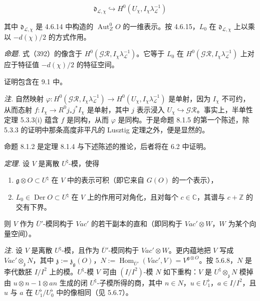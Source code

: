 \begin{equation}\tag{392}
\mathfrak{d}_{\mathcal{L},\chi}\hookrightarrow H^{0}(U_{\chi},I_{\chi}\lambda_{\mathcal{L}}^{-1})
\end{equation}

其中 $\mathfrak{d}_{\mathcal{L},\chi}$ 是 4.6.14 中构造的 $\operatorname{Aut}^{0}_{Z}O$ 的一维表示。按 4.6.15，$L_{0}$ 在 $\mathfrak{d}_{\mathcal{L},\chi}$ 上以乘以 $-d(\chi)/2$ 的方式作用。

 \emph{命题.} 式（392）的像含于 $H^{0}(\mathcal{GR},I_{\chi}\lambda_{\mathcal{L}}^{-1})$。它等于 $L_{0}$ 在 $H^{0}(\mathcal{GR},I_{\chi}\lambda_{\mathcal{L}}^{-1})$ 上对应于特征值 $-d(\chi)/2$ 的特征空间。

证明包含在 9.1 中。

\emph{注.} 自然映射 $\varphi:H^{0}(\mathcal{GR},I_{\chi}\lambda_{\mathcal{L}}^{-1})\to H^{0}(U_{\chi},I_{\chi}\lambda_{\mathcal{L}}^{-1})$ 是单射，因为 $I_{\chi}$ 不可约，从而态射 $f:I_{\chi}\to R^{0}j_{*}j^{*}I_{\chi}$ 是单射，其中 $j$ 表示浸入 $U_{\chi}\hookrightarrow\mathcal{GR}$。事实上，半单性定理 5.3.3(i) 蕴含 $f$ 是同构，从而 $\varphi$ 是同构。于是命题 8.1.5 的第一个陈述，除 5.3.3 的证明中那条高度非平凡的 Lusztig 定理之外，便是显然的。

命题 8.1.2 是定理 8.1.4 与下述陈述的推论，后者将在 6.2 中证明。

 \emph{定理.} 设 $V$ 是离散 $U^{\natural}$-模，使得

\begin{enumerate}[leftmargin=2.2em]
\item[1)] $\mathfrak{g}\otimes O\subset U^{\natural}$ 在 $V$ 中的表示可积（即它来自 $G(O)$ 的一个表示），
\item[2)] $L_{0}\in\operatorname{Der}O\subset U^{\natural}$ 在 $V$ 上的作用可对角化，且对每个 $c\in\mathbb{C}$，其谱与 $c+\mathbb{Z}$ 的交有下界。
\end{enumerate}

则 $V$ 作为 $\overline{U}'$-模同构于 $\mathit{Vac}'$ 的若干副本的直和（即同构于 $\mathit{Vac}'\otimes W$，$W$ 为某个向量空间）。


\emph{注.} 设 $V$ 是离散 $U^{\natural}$-模，且作为 $\overline{U}'$-模同构于 $\mathit{Vac}'\otimes W$。更内蕴地把 $V$ 写成 $\mathit{Vac}'\otimes_{\mathfrak{z}}N$，其中 $\mathfrak{z}:=\mathfrak{z}_{\mathfrak{g}}(O)$，$N:=\operatorname{Hom}_{\overline{U}'}(\mathit{Vac}',V)=V^{\mathfrak{g}\otimes O}$。按 5.6.8，$N$ 是李代数胚 $I/I^{2}$ 上的模。$U^{\natural}$-模 $V$ 可由 $(I/I^{2})$-模 $N$ 如下重构：$V$ 是 $U^{\natural}\otimes_{\mathfrak{z}}N$ 模掉由 $u\otimes n-1\otimes an$ 生成的闭 $U^{\natural}$-子模所得的商，其中 $n\in N$，$u\in U^{\flat}_{1}$，$a\in I/I^{2}$，且 $u$ 与 $a$ 在 $U^{\flat}_{1}/U^{\flat}_{0}$ 中的像相同（见 5.6.7）。
